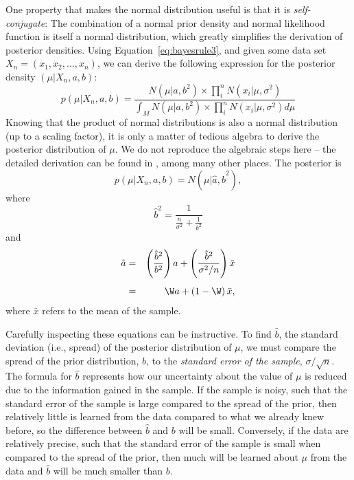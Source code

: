 One property that makes the normal distribution useful is that it is \emph{self-conjugate}: The combination of a normal prior density and normal likelihood function is itself a normal distribution, which greatly simplifies the derivation of posterior densities. Using Equation~\ref{eq:bayesrule3}, and given some data set $X_n=(x_1,x_2,...,x_{n})$, we can derive the following expression for the posterior density $(\mu|X_n,a,b)$:
$$p(\mu|X_n,a,b) = \dfrac{N(\mu|a,b^2)\times\prod_i^n N(x_i|\mu,\sigma^2)}{\int_{M}N(\mu|a,b^2)\times\prod_i^n N(x_i|\mu,\sigma^2)d\mu}$$
Knowing that the product of normal distributions is also a normal distribution (up to a scaling factor), it is only a matter of tedious algebra to derive the posterior distribution of $\mu$. We do not reproduce the algebraic steps here -- the detailed derivation can be found in \cite{GelmanEtAl2004}, among many other places. The posterior is
$$p(\mu|X_n,a,b) = N\left(\mu|\hat{a},\hat{b}^2\right),$$
where 
$$\hat{b}^2 = {\frac{1}{\frac{n}{\sigma^2}+\frac{1}{b^2}}}$$
and 
\begin{eqnarray*}
\hat{a} &=& \left( \frac{\hat{b}^2}{b^2}\right)a
           +\left( \frac{\hat{b}^2}{\sigma^2/n} \right) \bar x\\[1ex]
        &=& \W a + \left(1-\W\right)\bar x,
\end{eqnarray*}
where $\bar{x}$ refers to the mean of the sample.

Carefully inspecting these equations can be instructive. To find $\hat{b}$, the standard deviation (i.e., spread) of the posterior distribution of $\mu$, we must compare the spread of the prior distribution, $b$, to the \emph{standard error of the sample}, $\sigma/\sqrt{n}$. The formula for $\hat{b}$ represents how our uncertainty about the value of $\mu$ is reduced due to the information gained in the sample. If the sample is noisy, such that the standard error of the sample is large compared to the spread of the prior, then relatively little is learned from the data compared to what we already knew before, so the difference between $\hat{b}$ and $b$ will be small. Conversely, if the data are relatively precise, such that the standard error of the sample is small when compared to the spread of the prior, then much will be learned about $\mu$ from the data and $\hat{b}$ will be much smaller than $b$. 

